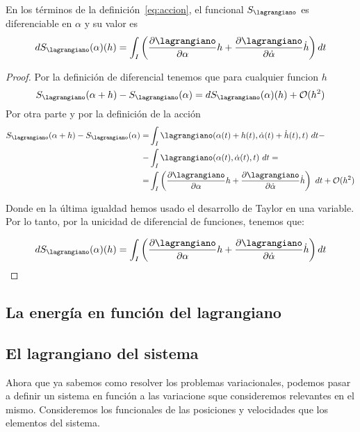 \begin{proposition}
	En los términos de la definición~\eqref{eq:accion}, el funcional $S_\lagrangiano$ es diferenciable en $\alpha$ y su valor es
	\begin{equation}
		\label{eq:accion_diferencial}
		dS_\lagrangiano(\alpha)(h)=\int_{I}\left( \frac{\partial \lagrangiano}{\partial\alpha}h+\frac{\partial \lagrangiano}{\partial\dot{\alpha}}\dot{h}\right) dt
	\end{equation}
\end{proposition}
\begin{proof}
	Por la definición de diferencial tenemos que para cualquier funcion $h$
	\begin{equation*}
		S_\lagrangiano(\alpha + h) -  S_\lagrangiano(\alpha) = dS_\lagrangiano(\alpha)(h) +\mathcal{O}(h^2)
	\end{equation*}
	Por otra parte y por la definición de la acción
	\begin{equation*}
		\begin{split}
			S_\lagrangiano(\alpha + h) -  S_\lagrangiano(\alpha) = & \int_{I}\lagrangiano(\alpha(t)+h(t), \dot{\alpha}(t)+\dot{h}(t), t)\ dt - \\
			- & \int_{I}\lagrangiano(\alpha(t), \dot{\alpha}(t), t)\ dt =\\
			=& \int_{I}\left( \frac{\partial \lagrangiano}{\partial\alpha}h+\frac{\partial \lagrangiano}{\partial\dot{\alpha}}\dot{h}\right)\ dt+\mathcal{O}(h^2)
		\end{split}
	\end{equation*}

	Donde en la última igualdad hemos usado el desarrollo de Taylor en una variable.
	Por lo tanto, por la unicidad de diferencial de funciones, tenemos que:

	\begin{equation*}
		dS_\lagrangiano(\alpha)(h) =\int_{I}\left( \frac{\partial \lagrangiano}{\partial\alpha}h+\frac{\partial \lagrangiano}{\partial\dot{\alpha}}\dot{h}\right) dt
	\end{equation*}

\end{proof}


\subsection{La energía en función del lagrangiano}\label{sec:la-energia-en-funcion-del-lagrangiano}


\subsection{El lagrangiano del sistema}
Ahora que ya sabemos como resolver los problemas variacionales, podemos pasar a definir un sistema en función a las variacione sque consideremos relevantes en el mismo.
Consideremos los funcionales de las posiciones y velocidades que los elementos del sistema.

